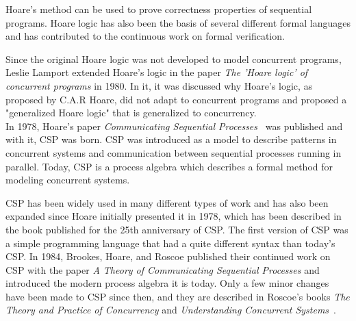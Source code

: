 Hoare's method can be used to prove correctness properties of sequential programs. Hoare logic has also been the basis of several different formal languages and has contributed to the continuous work on formal verification.

Since the original Hoare logic was not developed to model concurrent programs, Leslie Lamport extended Hoare's logic in the paper \textit{The 'Hoare logic' of concurrent programs}\cite{Lamport1980} in 1980. In it, it was discussed why Hoare's logic, as proposed by C.A.R Hoare, did not adapt to concurrent programs and proposed a "generalized Hoare logic" that is generalized to concurrency. \\

In 1978, Hoare's paper \textit{Communicating Sequential Processes}~\cite{Hoare1978} was published and with it, CSP was born.
CSP was introduced as a model to describe patterns in concurrent systems and communication between sequential processes running in parallel. Today, CSP is a process algebra which describes a formal method for modeling concurrent systems.

CSP has been widely used in many different types of work and has also been expanded since Hoare initially presented it in 1978, which has been described in the book\cite{Abdallah2005} published for the 25th anniversary of CSP.
The first version of CSP was a simple programming language that had a quite different syntax than today's CSP. In 1984, Brookes, Hoare, and Roscoe published their continued work on CSP with the paper \textit{A Theory of Communicating Sequential Processes}\cite{Brookes1984} and introduced the modern process algebra it is today. Only a few minor changes have been made to CSP since then, and they are described in Roscoe's books \textit{The Theory and Practice of Concurrency}\cite{Roscoe1997} and \textit{Understanding Concurrent Systems}~\cite{Roscoe2010}.\\

